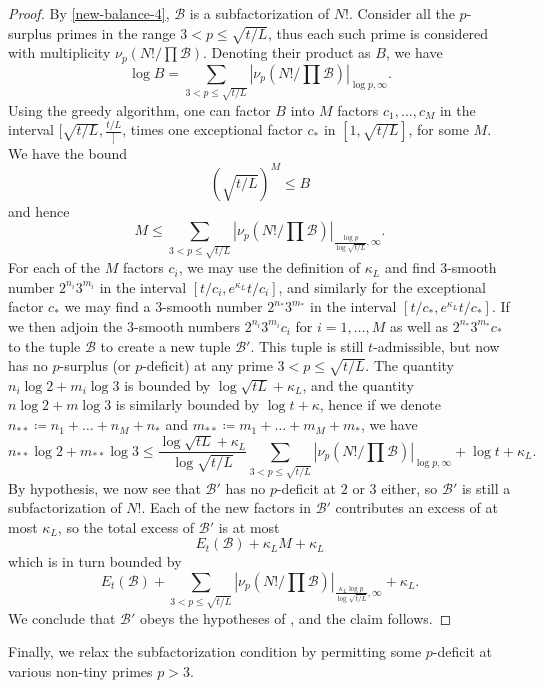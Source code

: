 \documentclass[12pt,a4paper,reqno]{amsart}
\numberwithin{equation}{section}
\theoremstyle{plain}
\theoremstyle{definition}
\newcommand\tuple{{\mathcal B}}
\begin{document}
\begin{proof} By \eqref{new-balance-4}, $\tuple$ is a subfactorization of $N!$. Consider all the $p$-surplus primes in the range $3 < p \leq \sqrt{t/L}$, thus each such prime is considered with multiplicity $\nu_p(N!/\prod \tuple)$.  Denoting their product as $B$, we have
  $$ \log B = \sum_{3 < p \leq \sqrt{t/L}}
  |\nu_p(N!/\prod \tuple)|_{\log p,\infty}.$$
Using the greedy algorithm, one can factor $B$ into $M$ factors $c_1,\dots,c_M$ in the interval $[\sqrt{t/L}, \frac{t/L}]$, times one exceptional factor $c_*$ in $[1,\sqrt{t/L}]$, for some $M$.  We have the bound
$$ (\sqrt{t/L})^M \leq B$$
and hence
$$ M \leq \sum_{3 < p \leq \sqrt{t/L}}
|\nu_p(N!/\prod \tuple)|_{\frac{\log p}{\log\sqrt{t/L}},\infty}.$$
For each of the $M$ factors $c_i$, we may use the definition of $\kappa_L$ and find $3$-smooth number $2^{n_i} 3^{m_i}$ in the interval $[t/c_i,e^{\kappa_L} t/c_i]$, and similarly for the exceptional factor $c_*$ we may find a $3$-smooth number $2^{n_*} 3^{m_*}$ in the interval $[t/c_*,e^{\kappa_L} t/c_*]$.  If we then adjoin the $3$-smooth numbers $2^{n_i} 3^{m_i} c_i$ for $i=1,\dots,M$ as well as $2^{n_*} 3^{m_*} c_*$ to the tuple $\tuple$ to create a new tuple $\tuple'$.  This tuple is still $t$-admissible, but now has no $p$-surplus (or $p$-deficit) at any prime $3 < p \leq \sqrt{t/L}$.  The quantity $n_i \log 2 + m_i \log 3$ is bounded by $\log \sqrt{tL} + \kappa_L$, and the quantity $n \log 2 + m \log 3$ is similarly bounded by $\log t + \kappa$, hence if we denote $n_{**} \coloneqq n_1 + \dots + n_M + n_*$ and $m_{**} \coloneqq m_1 + \dots + m_M + m_*$, we have
$$ n_{**} \log 2 + m_{**} \log 3 \leq 
\frac{\log \sqrt{tL} + \kappa_L}{\log\sqrt{t/L}}
\sum_{3 < p \leq \sqrt{t/L}}
|\nu_p(N!/\prod \tuple)|_{\log p,\infty}
+ \log t + \kappa_L.$$
By hypothesis, we now see that $\tuple'$ has no $p$-deficit at $2$ or $3$ either, so $\tuple'$ is still a subfactorization of $N!$.  Each of the new factors in $\tuple'$ contributes an excess of at most $\kappa_L$, so the total excess of $\tuple'$ is at most
$$ E_t(\tuple) + \kappa_L M + \kappa_L$$
which is in turn bounded by
$$ E_t(\tuple) + \sum_{3 < p \leq \sqrt{t/L}}
|\nu_p(N!/\prod \tuple)|_{\frac{\kappa_L \log p}{\log\sqrt{t/L}},\infty} + \kappa_L.$$
We conclude that $\tuple'$ obeys the hypotheses of , and the claim follows.
\end{proof}

Finally, we relax the subfactorization condition by permitting some $p$-deficit at various non-tiny primes $p>3$.
\end{document}
